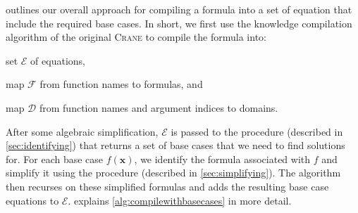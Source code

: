 \documentclass{article}
\theoremstyle{remark}
\begin{document}
 outlines our overall approach for compiling a
formula into a set of equation that include the required base cases. In short,
we first use the knowledge compilation algorithm of the original \textsc{Crane}
to compile the formula into:
\begin{enumerate*}[label=(\roman*)]
  \item set $\mathcal{E}$ of equations,
  \item map $\mathcal{F}$ from function names to formulas, and
  \item map $\mathcal{D}$ from function names and argument indices to domains.
\end{enumerate*}
After some algebraic simplification, $\mathcal{E}$ is passed to the
\FindBaseCases procedure (described in \cref{sec:identifying}) that returns a
set of base cases that we need to find solutions for. For each base case
$f(\mathbf{x})$, we identify the formula associated with $f$ and simplify it
using the \Propagate procedure (described in \cref{sec:simplifying}). The
algorithm then recurses on these simplified formulas and adds the resulting base
case equations to $\mathcal{E}$.  explains
\cref{alg:compilewithbasecases} in more detail.
\end{document}
